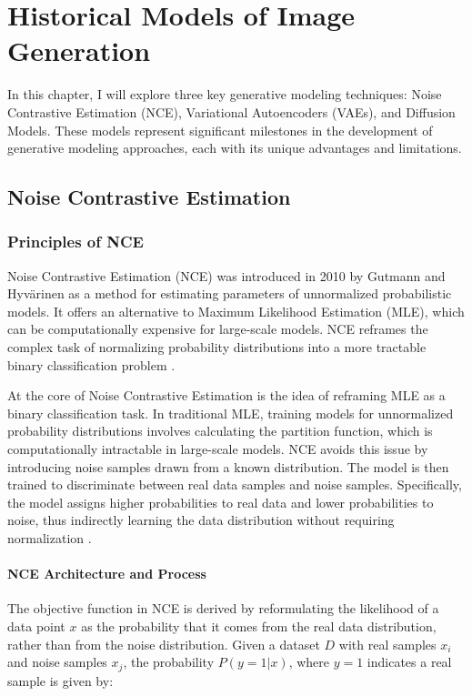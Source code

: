 \chapter{Historical Models of Image Generation}

In this chapter, I will explore three key generative modeling techniques: Noise Contrastive Estimation (NCE), Variational Autoencoders (VAEs), and Diffusion Models. These models represent significant milestones in the development of generative modeling approaches, each with its unique advantages and limitations. 

\section{Noise Contrastive Estimation}

\subsection{Principles of NCE}

Noise Contrastive Estimation (NCE) was introduced in 2010 by Gutmann and Hyvärinen as a method for estimating parameters of unnormalized probabilistic models. It offers an alternative to Maximum Likelihood Estimation (MLE), which can be computationally expensive for large-scale models. NCE reframes the complex task of normalizing probability distributions into a more tractable binary classification problem \citep{10.48550/arxiv.1711.00658}.

At the core of Noise Contrastive Estimation is the idea of reframing MLE as a binary classification task. In traditional MLE, training models for unnormalized probability distributions involves calculating the partition function, which is computationally intractable in large-scale models. NCE avoids this issue by introducing noise samples drawn from a known distribution. The model is then trained to discriminate between real data samples and noise samples. Specifically, the model assigns higher probabilities to real data and lower probabilities to noise, thus indirectly learning the data distribution without requiring normalization \citep{10.48550/arxiv.2110.11271}.

\subsubsection{NCE Architecture and Process}

The objective function in NCE is derived by reformulating the likelihood of a data point \( x \) as the probability that it comes from the real data distribution, rather than from the noise distribution. Given a dataset \( D \) with real samples \( x_i \) and noise samples \( x_j \), the probability \( P(y = 1 | x) \), where \( y = 1 \) indicates a real sample is given by:

